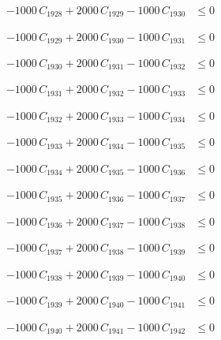 \documentclass[a4paper,11pt]{article}
\begin{document}
\begin{align}
-1000\,C_{1928} + 2000\,C_{1929} - 1000\,C_{1930} &\leq 0 \nonumber
\end{align}

\begin{align}
-1000\,C_{1929} + 2000\,C_{1930} - 1000\,C_{1931} &\leq 0 \nonumber
\end{align}

\begin{align}
-1000\,C_{1930} + 2000\,C_{1931} - 1000\,C_{1932} &\leq 0 \nonumber
\end{align}

\begin{align}
-1000\,C_{1931} + 2000\,C_{1932} - 1000\,C_{1933} &\leq 0 \nonumber
\end{align}

\begin{align}
-1000\,C_{1932} + 2000\,C_{1933} - 1000\,C_{1934} &\leq 0 \nonumber
\end{align}

\begin{align}
-1000\,C_{1933} + 2000\,C_{1934} - 1000\,C_{1935} &\leq 0 \nonumber
\end{align}

\begin{align}
-1000\,C_{1934} + 2000\,C_{1935} - 1000\,C_{1936} &\leq 0 \nonumber
\end{align}

\begin{align}
-1000\,C_{1935} + 2000\,C_{1936} - 1000\,C_{1937} &\leq 0 \nonumber
\end{align}

\begin{align}
-1000\,C_{1936} + 2000\,C_{1937} - 1000\,C_{1938} &\leq 0 \nonumber
\end{align}

\begin{align}
-1000\,C_{1937} + 2000\,C_{1938} - 1000\,C_{1939} &\leq 0 \nonumber
\end{align}

\begin{align}
-1000\,C_{1938} + 2000\,C_{1939} - 1000\,C_{1940} &\leq 0 \nonumber
\end{align}

\begin{align}
-1000\,C_{1939} + 2000\,C_{1940} - 1000\,C_{1941} &\leq 0 \nonumber
\end{align}

\begin{align}
-1000\,C_{1940} + 2000\,C_{1941} - 1000\,C_{1942} &\leq 0 \nonumber
\end{align}
\end{document}
